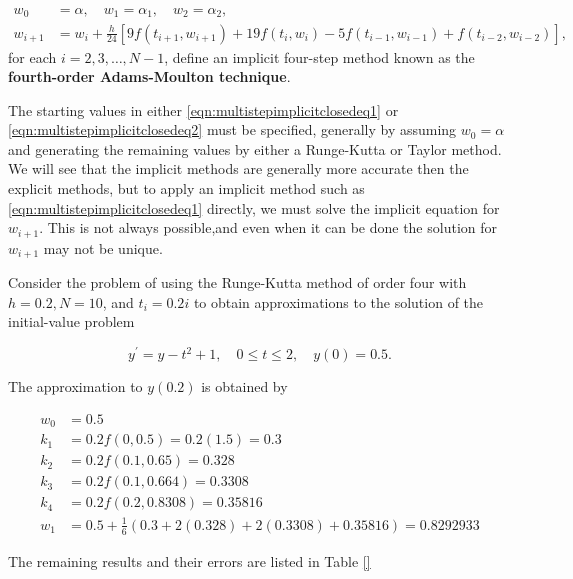 \begin{equation}\label{eqn:multistepimplicitclosedeq2}
\begin{split}
w_0 &=\alpha,\quad w_1 =\alpha_1,\quad w_2 =\alpha_2,\\
 w_{i+1} &= w_i + \frac{h}{24}[9f(t_{i+1},w_{i+1}) +19f(t_i,w_i)-5f(t_{i-1},w_{i-1})+f(t_{i-2},w_{i-2})],
\end{split}
\end{equation}
for each $i = 2, 3, \ldots, N-1$, define an implicit four-step method known as the {\bf fourth-order Adams-Moulton technique}. 

The starting values in either \ref{eqn:multistepimplicitclosedeq1} or \ref{eqn:multistepimplicitclosedeq2} must be specified, generally by assuming $w_0 =\alpha$ and generating the remaining values by either a Runge-Kutta or Taylor method. We will see that the implicit methods are generally more accurate then the explicit methods, but to apply an implicit method such as \ref{eqn:multistepimplicitclosedeq1} directly, we must solve the implicit equation for $w_{i+1}$. This is not always possible,and even when it can be done the solution for $w_{i+1}$ may not be unique.


Consider the problem of using the Runge-Kutta method of order four with $h=0.2, N=10$, and $t_{i}=0.2 i$ to obtain approximations to the solution of the initial-value problem

$$
y^{\prime}=y-t^{2}+1, \quad 0 \leq t \leq 2, \quad y(0)=0.5 .
$$

The approximation to $y(0.2)$ is obtained by

$$
\begin{aligned}
w_{0} & =0.5 \\
k_{1} & =0.2 f(0,0.5)=0.2(1.5)=0.3 \\
k_{2} & =0.2 f(0.1,0.65)=0.328 \\
k_{3} & =0.2 f(0.1,0.664)=0.3308 \\
k_{4} & =0.2 f(0.2,0.8308)=0.35816 \\
w_{1} & =0.5+\frac{1}{6}(0.3+2(0.328)+2(0.3308)+0.35816)=0.8292933
\end{aligned}
$$

The remaining results and their errors are listed in Table \ref{}

